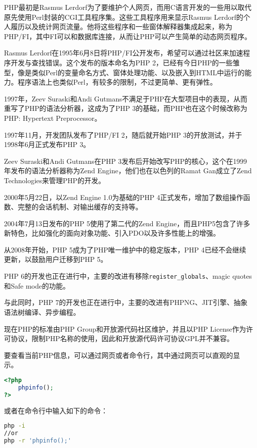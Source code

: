 PHP最初是Rasmus Lerdorf为了要维护个人网页，而用C语言开发的一些用以取代原先使用Perl封装的CGI工具程序集。这些工具程序用来显示Rasmus Lerdorf的个人履历以及统计网页流量。他将这些程序和一些窗体解释器集成起来，称为PHP/FI，其中FI可以和数据库连接，从而让PHP可以产生简单的动态网页程序。

Rasmus Lerdorf在1995年6月8日将PHP/FI公开发布，希望可以通过社区来加速程序开发与查找错误。这个发布的版本命名为PHP 2，已经有今日PHP的一些雏型，像是类似Perl的变量命名方式、窗体处理功能、以及嵌入到HTML中运行的能力。程序语法上也类似Perl，有较多的限制，不过更简单、更有弹性。

1997年，Zeev Suraski和Andi Gutmans不满足于PHP在大型项目中的表现，从而重写了PHP的语法分析器，这成为了PHP 3的基础，而PHP也在这个时候改称为PHP: Hypertext Preprocessor。

1997年11月，开发团队发布了PHP/FI 2，随后就开始PHP 3的开放测试，并于1998年6月正式发布PHP 3。

Zeev Suraski和Andi Gutmans在PHP 3发布后开始改写PHP的核心，这个在1999年发布的语法分析器称为Zend Engine，他们也在以色列的Ramat Gan成立了Zend Technologies来管理PHP的开发。

2000年5月22日，以Zend Engine 1.0为基础的PHP 4正式发布，增加了数组操作函数、完整的会话机制、对输出缓存的支持等。

2004年7月13日发布的PHP 5使用了第二代的Zend Engine，而且PHP5包含了许多新特色，比如强化的面向对象功能、引入PDO以及许多性能上的增强。



从2008年开始，PHP 5成为了PHP唯一维护中的稳定版本，PHP 4已经不会继续更新，以鼓励用户迁移到PHP 5。

PHP 6的开发也正在进行中，主要的改进有移除\texttt{register\_globals}、magic quotes和Safe mode的功能。

与此同时，PHP 7的开发也正在进行中，主要的改进有PHPNG、JIT引擎、抽象语法树编译、异步编程。

现在PHP的标准由PHP Group和开放源代码社区维护，并且以PHP License作为许可协议，限制PHP名称的使用，因此和开放源代码许可协议GPL并不兼容。




要查看当前PHP信息，可以通过网页或者命令行，其中通过网页可以直观的显示。

\begin{lstlisting}[language=PHP]
<?php
	phpinfo();
?>
\end{lstlisting}

或者在命令行中输入如下的命令：

\begin{lstlisting}[language=bash]
php -i
//or
php -r 'phpinfo();'
\end{lstlisting}

